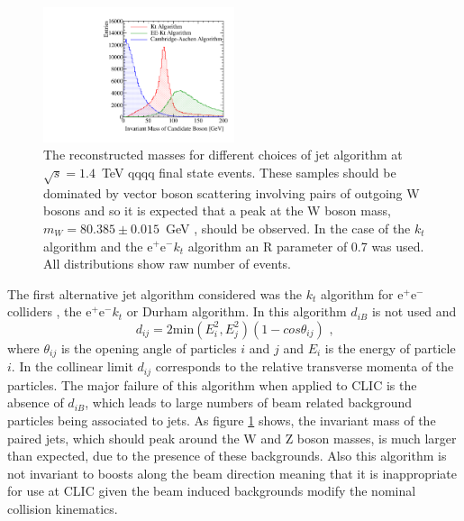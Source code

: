 \begin{figure}[h!]
\centering
\includegraphics[width=0.5\textwidth]{PhysicsAnalysis/Plots/SimpleInvMassPlot/InvariantMassesAlgorithmVeto.pdf}
\caption[The reconstructed masses for different choices of jet algorithm at $\sqrt{s}=1.4$~TeV \nu{\nu}qqqq final state events.  These samples should be dominated by vector boson scattering involving pairs of outgoing W bosons and so it is expected that a peak at the W boson mass, $m_{W} = 80.385 \pm 0.015$~GeV \cite{Beringer:1900zz}, should be observed.  In the case of the $k_{t}$ algorithm and the $\text{e}^{+}\text{e}^{-}k_{t}$  algorithm an R parameter of 0.7 was used.  All distributions show raw number of events.]{The reconstructed masses for different choices of jet algorithm at $\sqrt{s}=1.4$~TeV \nu{\nu}qqqq final state events.  These samples should be dominated by vector boson scattering involving pairs of outgoing W bosons and so it is expected that a peak at the W boson mass, $m_{W} = 80.385 \pm 0.015$~GeV \cite{Beringer:1900zz}, should be observed.  In the case of the $k_{t}$ algorithm and the $\text{e}^{+}\text{e}^{-}k_{t}$  algorithm an R parameter of 0.7 was used.  All distributions show raw number of events.}
\label{fig:invariantmassalgoveto}
\end{figure}

The first alternative jet algorithm considered was the $k_{t}$ algorithm for $\text{e}^{+}\text{e}^{-}$ colliders \cite{Catani:1991hj}, the $\text{e}^{+}\text{e}^{-}k_{t}$  or Durham algorithm.  In this algorithm $d_{iB}$ is not used and 
%
\begin{equation}
d_{ij} = 2\text{min}(E_{i}^{2}, E_{j}^{2})(1-cos\theta_{ij}) \text{ ,}
\end{equation}
%
\noindent where $\theta_{ij}$ is the opening angle of particles $i$ and $j$ and $E_{i}$ is the energy of particle $i$.  In the collinear limit $d_{ij}$ corresponds to the relative transverse momenta of the particles.  The major failure of this algorithm when applied to CLIC is the absence of $d_{iB}$, which leads to large numbers of beam related background particles being associated to jets.  As figure \ref{fig:invariantmassalgoveto} shows, the invariant mass of the paired jets, which should peak around the W and Z boson masses, is much larger than expected, due to the presence of these backgrounds.  Also this algorithm is not invariant to boosts along the beam direction meaning that it is inappropriate for use at CLIC given the beam induced backgrounds modify the nominal collision kinematics.  

